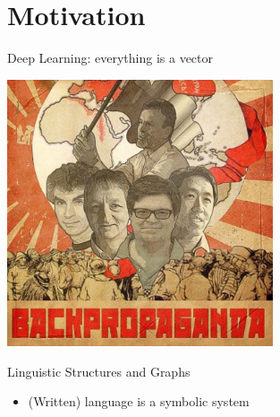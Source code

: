 
\section{Motivation}



\begin{frame}{Deep Learning: everything is a vector}
	\vspace{-15pt}
	
  \begin{center}
  	\includegraphics[width=0.59\textwidth]{figures/backprop}
  \end{center}
   

\end{frame}


\begin{frame}{Linguistic Structures and Graphs}
	
	\begin{itemize}
		\item (Written) language is a \alert{symbolic system}
	\end{itemize}
	
	
	
\end{frame}


